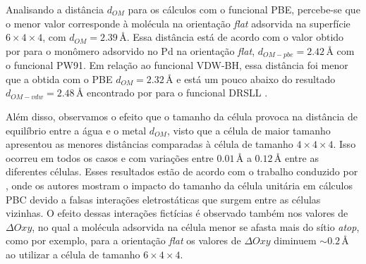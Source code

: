 Analisando a distância $ d_{OM}$ para os cálculos com o funcional PBE, percebe-se que o menor valor corresponde à molécula na orientação \textit{flat} adsorvida na superfície $ 6\times4\times4 $, com $ d_{OM}=2.39\,\si{\angstrom} $. Essa distância está de acordo com o valor obtido por \citeauthor{monomer} para o monômero adsorvido no Pd na orientação \textit{flat}, $ d_{OM-pbe}=2.42\,  \si{\angstrom}$ com o funcional PW91\cite{pw91}. Em relação ao funcional VDW-BH, essa distância foi menor que a obtida com o PBE $ d_{OM}=2.32\,\si{\angstrom} $ e está um pouco abaixo do resultado $d_{OM-vdw}=2.48 \,\si{\angstrom}$ encontrado por \citeauthor{adrien} para o funcional DRSLL \cite{DRSLL}. %

 Além disso, observamos o efeito que o tamanho da célula provoca na distância de equilíbrio entre a água e o metal $ d_{OM} $, visto que a célula de maior tamanho apresentou as menores distâncias comparadas à célula de tamanho $ 4\times4\times4$. Isso ocorreu em todos os casos e com variações entre $ 0.01\,\si{\angstrom} $ a $ 0.12\,\si{\angstrom} $ entre as diferentes células. Esses resultados estão de acordo com o trabalho conduzido por \citeauthor{adrien}, onde os autores mostram o impacto do tamanho da célula unitária em cálculos PBC devido a falsas interações eletrostáticas que surgem entre as células vizinhas. O efeito dessas interações fictícias é observado também nos valores de $ \Delta Oxy $, no qual a molécula adsorvida na célula menor se afasta mais do sítio \textit{atop}, como por exemplo, para a orientação \textit{flat} os valores de $ \Delta Oxy $ diminuem $ \sim 0.2\,\si{\angstrom} $ ao utilizar a célula de tamanho $ 6\times4\times4 $.
   
